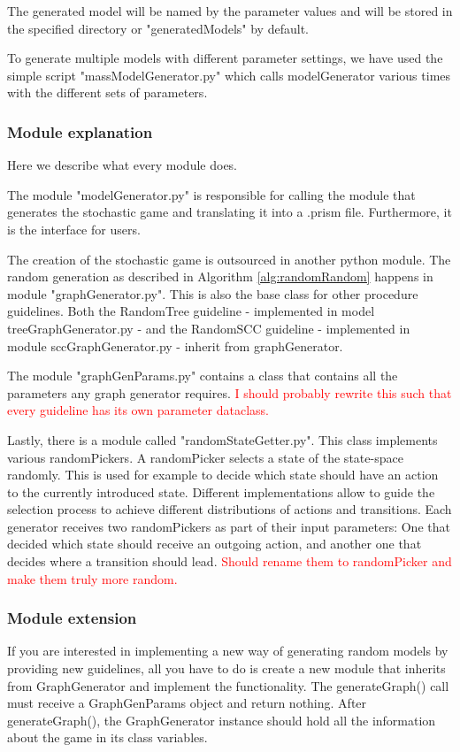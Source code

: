 The generated model will be named by the parameter values and will be stored in the specified directory or "generatedModels" by default.

To generate multiple models with different parameter settings, we have used the simple script "massModelGenerator.py" which calls modelGenerator various times with the different sets of parameters.

\subsubsection*{Module explanation}
Here we describe what every module does.

The module "modelGenerator.py" is responsible for calling the module that generates the stochastic game and translating it into a .prism file. 
Furthermore, it is the interface for users.

The creation of the stochastic game is outsourced in another python module. The random generation as described in Algorithm \ref{alg:randomRandom} happens in
module "graphGenerator.py". This is also the base class for other procedure guidelines. 
Both the RandomTree guideline - implemented in model treeGraphGenerator.py - and the RandomSCC guideline - implemented in module sccGraphGenerator.py - inherit
from graphGenerator.

The module "graphGenParams.py" contains a class that contains all the parameters any graph generator requires. 
\textcolor{red}{I should probably rewrite this such that every guideline has its own parameter dataclass.}

Lastly, there is a module called "randomStateGetter.py". This class implements various randomPickers.
A randomPicker selects a state of the state-space randomly.
This is used for example to decide which state should have an action to the currently introduced state.
Different implementations allow to guide the selection process to achieve different distributions of actions and transitions.
Each generator receives two randomPickers as part of their input parameters: One that decided which state should receive an outgoing action, 
and another one that decides where a transition should lead.
\textcolor{red}{Should rename them to randomPicker and make them truly more random.}

\subsubsection*{Module extension}
If you are interested in implementing a new way of generating random models by providing new guidelines, all you have to do is create a new
module that inherits from GraphGenerator and implement the functionality. The generateGraph() call must receive a GraphGenParams object and return nothing.
After generateGraph(), the GraphGenerator instance should hold all the information about the game in its class variables.